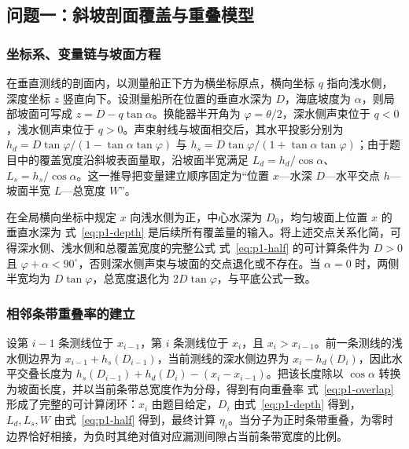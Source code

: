 \subsection{问题一：斜坡剖面覆盖与重叠模型}
\subsubsection{坐标系、变量链与坡面方程}
在垂直测线的剖面内，以测量船正下方为横坐标原点，横向坐标 $q$ 指向浅水侧，深度坐标 $z$ 竖直向下。设测量船所在位置的垂直水深为 $D$，海底坡度为 $\alpha$，则局部坡面可写成 $z=D-q\tan\alpha$。换能器半开角为 $\varphi=\theta/2$，深水侧声束位于 $q<0$，浅水侧声束位于 $q>0$。声束射线与坡面相交后，其水平投影分别为 $h_d=D\tan\varphi/(1-\tan\alpha\tan\varphi)$ 与 $h_s=D\tan\varphi/(1+\tan\alpha\tan\varphi)$；由于题目中的覆盖宽度沿斜坡表面量取，沿坡面半宽满足 $L_d=h_d/\cos\alpha$、$L_s=h_s/\cos\alpha$。这一推导把变量建立顺序固定为“位置 $x$—水深 $D$—水平交点 $h$—坡面半宽 $L$—总宽度 $W$”。

在全局横向坐标中规定 $x$ 向浅水侧为正，中心水深为 $D_0$，均匀坡面上位置 $x$ 的垂直水深为
式~\eqref{eq:p1-depth} 是后续所有覆盖量的输入。将上述交点关系化简，可得深水侧、浅水侧和总覆盖宽度的完整公式
式~\eqref{eq:p1-half} 的可计算条件为 $D>0$ 且 $\varphi+\alpha<90^\circ$，否则深水侧声束与坡面的交点退化或不存在。当 $\alpha=0$ 时，两侧半宽均为 $D\tan\varphi$，总宽度退化为 $2D\tan\varphi$，与平底公式一致。

\subsubsection{相邻条带重叠率的建立}
设第 $i-1$ 条测线位于 $x_{i-1}$，第 $i$ 条测线位于 $x_i$，且 $x_i>x_{i-1}$。前一条测线的浅水侧边界为 $x_{i-1}+h_s(D_{i-1})$，当前测线的深水侧边界为 $x_i-h_d(D_i)$，因此水平交叠长度为 $h_s(D_{i-1})+h_d(D_i)-(x_i-x_{i-1})$。把该长度除以 $\cos\alpha$ 转换为坡面长度，并以当前条带总宽度作为分母，得到有向重叠率
式~\eqref{eq:p1-overlap} 形成了完整的可计算闭环：$x_i$ 由题目给定，$D_i$ 由式~\eqref{eq:p1-depth} 得到，$L_d,L_s,W$ 由式~\eqref{eq:p1-half} 得到，最终计算 $\eta_i$。当分子为正时条带重叠，为零时边界恰好相接，为负时其绝对值对应漏测间隙占当前条带宽度的比例。


